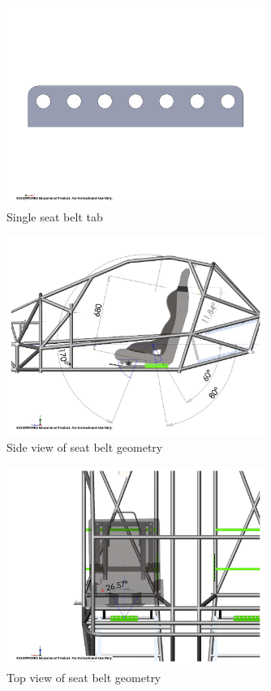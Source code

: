 \documentclass[10pt]{article}
\begin{document}
\begin{figure}
\centering
\includegraphics[width=0.75\textwidth]{figures/seat-belt-tab}
\caption{Single seat belt tab}
\label{fig:seat-belt-tab}
\end{figure}

\begin{figure}
\centering
\includegraphics[width=0.75\textwidth]{figures/seat-belt-side-view}
\caption{Side view of seat belt geometry}
\label{fig:seat-belt-side-view}
\end{figure}

\begin{figure}
\centering
\includegraphics[width=0.75\textwidth]{figures/seat-belt-top-view}
\caption{Top view of seat belt geometry}
\label{fig:seat-belt-top-view}
\end{figure}
\end{document}
